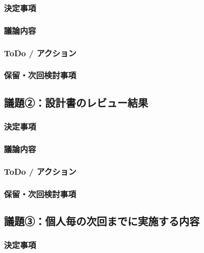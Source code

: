 \documentclass[a4paper,12pt]{ltjsarticle}
\begin{document}
\subsubsection*{決定事項}

\subsubsection*{議論内容}

\subsubsection*{ToDo / アクション}

\subsubsection*{保留・次回検討事項}

\subsection*{議題②：設計書のレビュー結果}

\subsubsection*{決定事項}

\subsubsection*{議論内容}

\subsubsection*{ToDo / アクション}

\subsubsection*{保留・次回検討事項}

\subsection*{議題③：個人毎の次回までに実施する内容}

\subsubsection*{決定事項}
\end{document}
